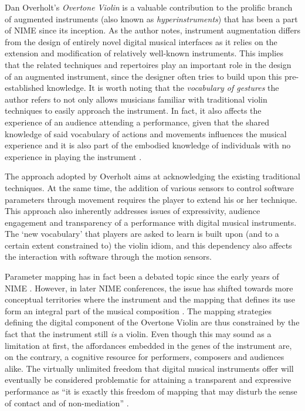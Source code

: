 Dan Overholt's \textit{Overtone Violin} is a valuable contribution to the prolific branch of augmented instruments (also known as \textit{hyperinstruments}) that has been a part of NIME since its inception. As the author notes, instrument augmentation differs from the design of entirely novel digital musical interfaces as it relies on the extension and modification of relatively well-known instruments. This implies that the related techniques and repertoires play an important role in the design of an augmented instrument, since the designer often tries to build upon this pre-established knowledge. It is worth noting that the \textit{vocabulary of gestures} the author refers to not only allows musicians familiar with traditional violin techniques to easily approach the instrument. In fact, it also affects the experience of an audience attending a performance, given that the shared knowledge of said vocabulary of actions and movements influences the musical experience and it is also part of the embodied knowledge of individuals with no experience in playing the instrument \cite{Visi:2015}.

The approach adopted by Overholt aims at acknowledging the existing traditional techniques. At the same time, the addition of various sensors to control software parameters through movement requires the player to extend his or her technique. This approach also inherently addresses issues of expressivity, audience engagement and transparency of a performance with digital musical instruments. The `new vocabulary' that players are asked to learn is built upon (and to a certain extent constrained to) the violin idiom, and this dependency also affects the interaction with software through the motion sensors.

Parameter mapping has in fact been a debated topic since the early years of NIME \cite{Hunt:2002}. However, in later NIME conferences, the issue has shifted towards more conceptual territories where the instrument and the mapping that defines its use form an integral part of the musical composition \cite{Murray-Browne:2011}. The mapping strategies defining the digital component of the Overtone Violin are thus constrained by the fact that the instrument still \textit{is} a violin. Even though this may sound as a limitation at first, the affordances embedded in the genes of the instrument are, on the contrary, a cognitive resource for performers, composers and audiences alike. The virtually unlimited freedom that digital musical instruments offer will eventually be considered problematic for attaining a transparent and expressive performance as ``it is exactly this freedom of mapping that may disturb the sense of contact and of non-mediation'' \cite{Leman:2007}.


